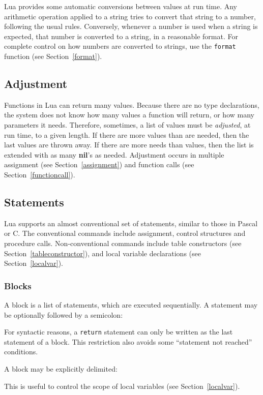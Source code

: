 \documentclass[11pt]{article}
\newcommand{\See}[1]{Section~\ref{#1}}
\newcommand{\see}[1]{(see \See{#1})}
\newcommand{\T}[1]{{\tt #1}}
\newcommand{\nil}{{\bf nil}}
\newcommand{\Index}[1]{#1\index{#1}}
\newcommand{\IndexVerb}[1]{\T{#1}\index{#1}}
\begin{document}
Lua provides some automatic conversions between values at run time.
Any arithmetic operation applied to a string tries to convert
that string to a number, following the usual rules.
Conversely, whenever a number is used when a string is expected,
that number is converted to a string, in a reasonable format.
For complete control on how numbers are converted to strings,
use the \verb|format| function \see{format}.


\subsection{\Index{Adjustment}} \label{adjust}

Functions in Lua can return many values.
Because there are no type declarations,
the system does not know how many values a function will return,
or how many parameters it needs.
Therefore, sometimes, a list of values must be \emph{adjusted}, at run time,
to a given length.
If there are more values than are needed,
then the last values are thrown away.
If there are more needs than values,
then the list is extended with as many  \nil's as needed.
Adjustment occurs in multiple assignment \see{assignment}
and function calls \see{functioncall}.


\subsection{Statements}\label{stats}

Lua supports an almost conventional set of \Index{statements},
similar to those in Pascal or C.
The conventional commands include
assignment, control structures and procedure calls.
Non-conventional commands include table constructors
\see{tableconstructor},
and local variable declarations \see{localvar}.

\subsubsection{Blocks}
A \Index{block} is a list of statements, which are executed sequentially.
A statement may be optionally followed by a semicolon:
\begin{Produc}
\end{Produc}%
For syntactic reasons, a \IndexVerb{return} statement can only be written
as the last statement of a block.
This restriction also avoids some ``statement not reached'' conditions.

A block may be explicitly delimited:
\begin{Produc}
\end{Produc}%
This is useful to control the scope of local variables \see{localvar}.
\end{document}
